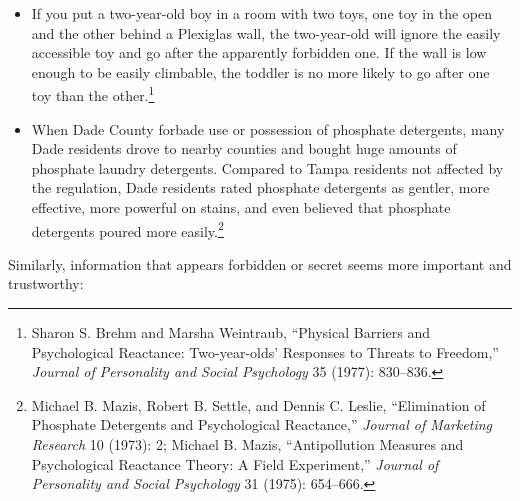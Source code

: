 \begin{itemize}
\item {
 If you put a two-year-old boy in a room with two toys, one toy in
the open and the other behind a Plexiglas wall, the two-year-old will
ignore the easily accessible toy and go after the apparently forbidden
one. If the wall is low enough to be easily climbable, the toddler is
no more likely to go after one toy than the other.\footnote{Sharon S. Brehm and Marsha Weintraub,
``Physical Barriers and Psychological Reactance:
Two-year-olds' Responses to Threats to
Freedom,'' \textit{Journal of Personality and Social
Psychology} 35 (1977): 830--836.}}

\item {
 When Dade County forbade use or possession of phosphate
detergents, many Dade residents drove to nearby counties and bought
huge amounts of phosphate laundry detergents. Compared to Tampa
residents not affected by the regulation, Dade residents rated
phosphate detergents as gentler, more effective, more powerful on
stains, and even believed that phosphate detergents poured more
easily.\footnote{Michael B. Mazis, Robert B. Settle, and Dennis C. Leslie,
``Elimination of Phosphate Detergents and
Psychological Reactance,'' \textit{Journal of
Marketing Research} 10 (1973): 2; Michael B. Mazis,
``Antipollution Measures and Psychological Reactance
Theory: A Field Experiment,'' \textit{Journal of
  Personality and Social Psychology} 31 (1975): 654--666.}}
\end{itemize}

{
 Similarly, information that appears forbidden or secret seems more
important and trustworthy:}


